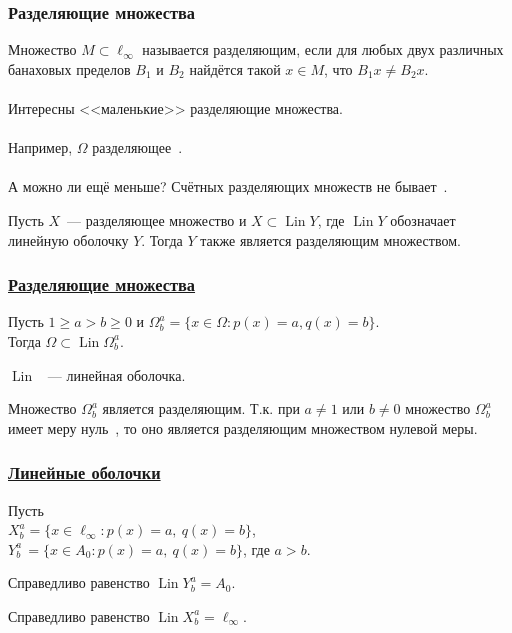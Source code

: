 \begin{frame}\frametitle{Разделяющие множества}
	Множество $M\subset \ell_\infty$ называется разделяющим,
	если для любых двух различных банаховых пределов $B_1$ и $B_2$
	найдётся такой $x\in M$, что $B_1 x \ne B_2 x$.
	\\~\\
	Интересны <<маленькие>> разделяющие множества.
	\\~\\
	Например, $\Omega$ разделяющее~\cite{semenov2010characteristic}.
	\\~\\
	А можно ли ещё меньше?
	\vfill
	Счётных разделяющих множеств не бывает~\cite{Semenov2014geomprops}.
	\vfill
	\begin{llemma}
		Пусть $X$~--- разделяющее множество и $X \subset \operatorname{Lin} Y$,
		где $\operatorname{Lin} Y$ обозначает линейную оболочку $Y$.
		Тогда $Y$ также является разделяющим множеством.
	\end{llemma}
\end{frame}


\begin{frame}\frametitle{\underline{Разделяющие множества}}

	\begin{ttheorem}
		Пусть
		$1 \geq a > b \geq 0$ и
		$\Omega^a_b = \{x\in\Omega : p(x) = a, q(x) = b\}$.
		\\
		Тогда $\Omega \subset \operatorname{Lin} \Omega^a_b$.
	\end{ttheorem}

	\vfill
	$\operatorname{Lin}$ ~--- линейная оболочка.
	\vfill
	\begin{ttheorem}
		Множество $\Omega^a_b$ является разделяющим.
		Т.к. при $a\neq 1$ или $b\neq 0$ множество $\Omega^a_b$ имеет меру нуль~\cite{semenov2010characteristic,connor1990almost},
		то оно является разделяющим множеством нулевой меры.
	\end{ttheorem}
\end{frame}


\begin{frame}\frametitle{\underline{Линейные оболочки}}

	Пусть
	\\
	$X^a_b = \{x\in\ell_\infty : p(x) = a,~ q(x) = b\}$,
	\\
	$Y^a_b\, = \{x\in A_0 : p(x) = a,~ q(x) = b\}$, где $a>b$.
	\vfill
	\begin{ttheorem}
		Справедливо равенство $\operatorname{Lin} Y^a_b = A_0$.
	\end{ttheorem}
	\vfill
	\begin{ttheorem}
		Справедливо равенство $\operatorname{Lin} X^a_b = \ell_\infty$.
	\end{ttheorem}

\end{frame}



